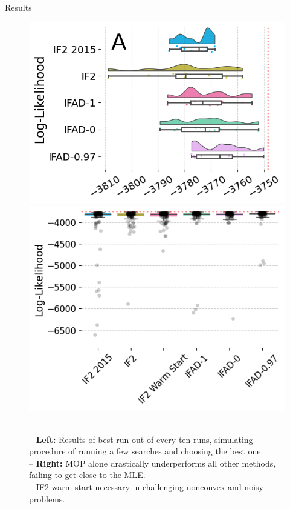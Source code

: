\documentclass{beamer}
\begin{document}
\begin{frame}{Results}
    
\begin{figure}[H]
    \centering
    \includegraphics[scale=0.28]{imgs/095/boxplot.png}
    \includegraphics[scale=0.31]{imgs/095/boxplotall.png}
    \caption{\\
    -- \textbf{Left:} Results of best run out of every ten runs, simulating procedure of running a few searches and choosing the best one. \\
    -- \textbf{Right:} MOP alone drastically underperforms all other methods, failing to get close to the MLE. \\
    -- IF2 warm start necessary in challenging nonconvex and noisy problems.}
    \label{fig:boxplot-search}
\end{figure}

\end{frame}
\end{document}
